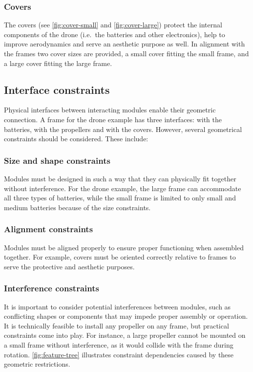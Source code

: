 \documentclass[sigconf,review]{acmart}
\begin{document}
\subsubsection*{Covers}
\label{sec:covers}

The covers (see \cref{fig:cover-small} and \cref{fig:cover-large}) protect the internal components of the drone (i.e.~the batteries and other electronics), help to improve aerodynamics and serve an aesthetic purpose as well.
In alignment with the frames two cover sizes are provided, a small cover fitting the small frame, and a large cover fitting the large frame.

\subsection{Interface constraints}
\label{sec:contraints}

Physical interfaces between interacting modules enable their geometric connection. 
A frame for the drone example has three interfaces: with the batteries, with the propellers and with the covers. 
However, several geometrical constraints should be considered. These include:

\subsubsection*{Size and shape constraints}

Modules must be designed in such a way that they can physically fit together without interference. 
For the drone example, the large frame can accommodate all three types of batteries, while the small frame is limited to only small and medium batteries because of the size constraints.

\subsubsection*{Alignment constraints}

Modules must be aligned properly to ensure proper functioning when assembled together. 
For example, covers must be oriented correctly relative to frames to serve the protective and aesthetic purposes. 

\subsubsection*{Interference constraints}

It is important to consider potential interferences between modules, such as conflicting shapes or components that may impede proper assembly or operation. 
It is technically feasible to install any propeller on any frame, but practical constraints come into play. 
For instance, a large propeller cannot be mounted on a small frame without interference, as it would collide with the frame during rotation.
\cref{fig:feature-tree} illustrates constraint dependencies caused by these geometric restrictions.
\end{document}

